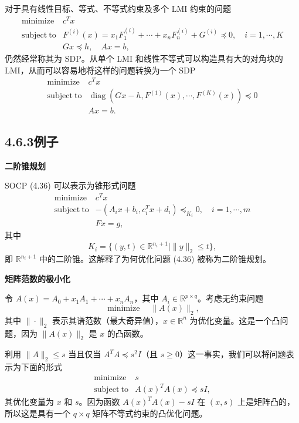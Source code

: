\documentclass[UTF8,12pt,a4paper,fontset=fandol]{ctexart}
\begin{document}
对于具有线性目标、等式、不等式约束及多个 LMI 约束的问题
\[
\begin{array}{ll}
\mathop{\mathrm{minimize}} & c^Tx\\
\mathrm{subject\ to} & F^{(i)}(x)=x_1F_1^{(i)}+\cdots+x_nF_n^{(i)}+G^{(i)}\preceq 0,\quad i=1,\cdots,K\\
& Gx\preceq h,\quad Ax=b,
\end{array}
\]
仍然经常称其为 SDP。从单个 LMI 和线性不等式可以构造具有大的对角块的 LMI，从而可以容易地将这样的问题转换为一个 SDP
\[
\begin{array}{ll}
\mathop{\mathrm{minimize}} & c^Tx\\
\mathrm{subject\ to} & \operatorname{diag}(Gx-h,F^{(1)}(x),\cdots,F^{(K)}(x))\preceq 0\\
& Ax=b.
\end{array}
\]

\subsection*{4.6.3\quad 例子}

\noindent\textbf{二阶锥规划}

SOCP (4.36) 可以表示为锥形式问题
\[
\begin{array}{ll}
\mathop{\mathrm{minimize}} & c^Tx\\
\mathrm{subject\ to} & -(A_ix+b_i,c_i^Tx+d_i)\preceq_{K_i}0,\quad i=1,\cdots,m\\
& Fx=g,
\end{array}
\]
其中
\[
K_i=\{(y,t)\in\mathbb{R}^{n_i+1}\mid \|y\|_2\leq t\},
\]
即 $\mathbb{R}^{n_i+1}$ 中的二阶锥。这解释了为何优化问题 (4.36) 被称为二阶锥规划。

\noindent\textbf{矩阵范数的极小化}

令 $A(x)=A_0+x_1A_1+\cdots+x_nA_n$，其中 $A_i\in\mathbb{R}^{p\times q}$。考虑无约束问题
\[
\mathop{\mathrm{minimize}}\quad \|A(x)\|_2,
\]
其中 $\|\cdot\|_2$ 表示其谱范数（最大奇异值），$x\in\mathbb{R}^n$ 为优化变量。这是一个凸问题，因为 $\|A(x)\|_2$ 是 $x$ 的凸函数。

利用 $\|A\|_2\leq s$ 当且仅当 $A^TA\preceq s^2I$（且 $s\geq 0$）这一事实，我们可以将问题表示为下面的形式
\[
\begin{array}{ll}
\mathop{\mathrm{minimize}} & s\\
\mathrm{subject\ to} & A(x)^TA(x)\preceq sI,
\end{array}
\]
其优化变量为 $x$ 和 $s$。因为函数 $A(x)^TA(x)-sI$ 在 $(x,s)$ 上是矩阵凸的，所以这是具有一个 $q\times q$ 矩阵不等式约束的凸优化问题。
\end{document}
